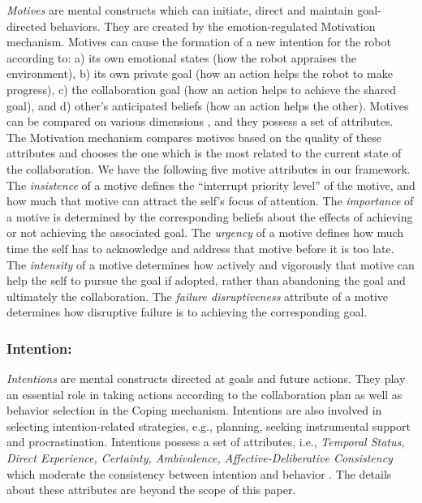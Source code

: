 \documentclass{aamas2016}
\begin{document}
\textit{Motives} are mental constructs which can initiate, direct and maintain
goal-directed behaviors. They are created by the emotion-regulated Motivation
mechanism. Motives can cause the formation of a new intention for the robot
according to: a) its own emotional states (how the robot appraises the
environment), b) its own private goal (how an action helps the robot to make
progress), c) the collaboration goal (how an action helps to achieve the shared
goal), and d) other's anticipated beliefs (how an action helps the other).
Motives can be compared on various dimensions \cite{sloman:motivation}, and
they possess a set of attributes. The Motivation mechanism compares motives
based on the quality of these attributes and chooses the one which is the most
related to the current state of the collaboration. We have the following five
motive attributes in our framework. The \textit{insistence} of a motive defines
the ``interrupt priority level'' of the motive, and how much that motive can
attract the self's focus of attention. The \textit{importance} of a motive is
determined by the corresponding beliefs about the effects of achieving or not
achieving the associated goal. The \textit{urgency} of a motive defines how much
time the self has to acknowledge and address that motive before it is too late.
The \textit{intensity} of a motive determines how actively and vigorously that
motive can help the self to pursue the goal if adopted, rather than abandoning
the goal and ultimately the collaboration. The \textit{failure disruptiveness}
attribute of a motive determines how disruptive failure is to achieving the
corresponding goal.

\subsubsection{Intention:}

\textit{Intentions} are mental constructs directed at goals and future actions.
They play an essential role in taking actions according to the collaboration
plan as well as behavior selection in the Coping mechanism. Intentions are
also involved in selecting intention-related strategies, e.g., planning, seeking
instrumental support and procrastination. Intentions possess a set of
attributes, i.e., \textit{Temporal Status, Direct Experience, Certainty,
Ambivalence, Affective-Deliberative Consistency} which moderate the consistency
between intention and behavior \cite{cooke:intention-behavior-consistency}. The
details about these attributes are beyond the scope of this paper.
\end{document}
